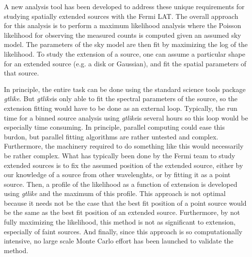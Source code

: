 \documentclass[preprint]{aastex}
\newcommand{\gtlike}{{\em gtlike}}
\begin{document}
A new analysis tool has been developed to address these unique
requirements for studying spatially extended sources with the Fermi
LAT. The overall approach for this analysis is to perform a maximum
likelihood analysis where the Poisson likelihood for observing the
measured counts is computed given an assumed sky model. The parameters
of the sky model are then fit by maximizing the log of the likelihood.
To study the extension of a source, one can assume a particular shape
for an extended source (e.g. a disk or Gaussian), and fit the spatial
parameters of that source.

In principle, the entire task can be done using the standard science
tools package \gtlike\cite{Science-Tools-gtlike}. But \gtlike is
only able to fit the spectral parameters of the source, so the extension
fitting would have to be done as an external loop. Typically, the run time
for a binned source analysis using \gtlike is several hours so this loop
would be especially time consuming. In principle, parallel computing could
ease this burdon, but parallel fitting algorithms are rather untested
and complex. Furthermore, the machinery required to do something like
this would necessarily be rather complex. What has typically been done by
the Fermi team to study extended sources is to fix the assumed position
of the extended source, either by our knowledge of a source from other
wavelenghts, or by fitting it as a point source. Then, a profile of the
likelihood as a function of extension is developed using \gtlike
and the maximum of this profile. This approach is not optimal because it
needs not be the case that the best fit position of a point source would
be the same as the best fit position of an extended source. Furthermore,
by not fully maximizing the likelihood, this method is not as significant to
extension, especially of faint sources. And finally, since this approach
is so computationally intensive, no large scale Monte Carlo effort has been
launched to validate the method.
\end{document}
